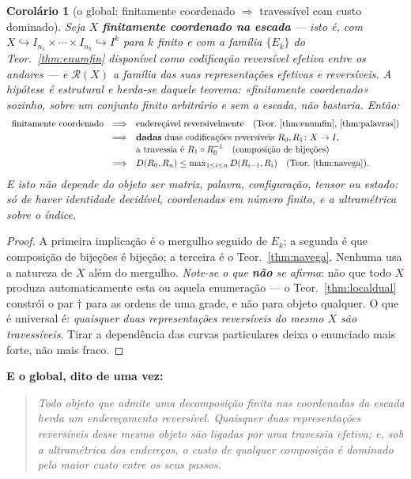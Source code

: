 \documentclass[11pt,a4paper]{article}
\newtheorem{corolario}[teorema]{Corolário}
\begin{document}
\begin{corolario}[o global: finitamente coordenado $\Rightarrow$ travessível com custo dominado]\label{cor:global}
Seja $X$ \textbf{finitamente coordenado \emph{na escada}} --- isto é, com
$X\hookrightarrow I_{n_1}\times\cdots\times I_{n_k}\hookrightarrow I^{k}$ para $k$
finito \emph{e} com a família $\{E_k\}$ do Teor.~\ref{thm:enumfin} disponível como
codificação reversível efetiva entre os andares --- e $\mathcal{R}(X)$ a família das
suas representações efetivas e reversíveis. \emph{A hipótese é estrutural e herda-se
daquele teorema}: «finitamente coordenado» sozinho, sobre um conjunto finito
arbitrário e sem a escada, não bastaria. Então:
\[
\begin{array}{rcl}
\text{finitamente coordenado} &\Longrightarrow& \text{endereçável reversivelmente}
   \quad(\text{Teor.~\ref{thm:enumfin}, \ref{thm:palavras}})\\[3pt]
&\Longrightarrow& \textbf{dadas} \text{ duas codificações reversíveis } R_0,R_1\colon X\to I,\\[1pt]
&& \text{a travessia é } R_1\circ R_0^{-1}\quad(\text{composição de bijeções})\\[3pt]
&\Longrightarrow& D(R_0,R_n)\le\max_{1\le i\le n} D(R_{i-1},R_i)
   \quad(\text{Teor.~\ref{thm:navega}}).
\end{array}
\]
E isto não depende do objeto ser matriz, palavra, configuração, tensor ou estado:
só de haver identidade decidível, coordenadas em número finito, e a ultramétrica
sobre o índice.
\end{corolario}

\begin{proof}
A primeira implicação é o mergulho seguido de $E_k$; a segunda é que composição de
bijeções é bijeção; a terceira é o Teor.~\ref{thm:navega}. Nenhuma usa a natureza de
$X$ além do mergulho. \emph{Note-se o que \textbf{não} se afirma}: não que todo $X$
produza automaticamente esta ou aquela enumeração --- o Teor.~\ref{thm:localdual}
constrói o par $\dagger$ para as ordens de uma grade, e não para objeto qualquer.
O que é universal é: \emph{quaisquer duas representações reversíveis do mesmo $X$
são travessíveis}. Tirar a dependência das curvas particulares deixa o enunciado
mais forte, não mais fraco.
\end{proof}

\medskip\noindent\textbf{E o global, dito de uma vez:}
\begin{quote}
\emph{Todo objeto que admite uma decomposição finita nas coordenadas da escada herda
um endereçamento reversível. Quaisquer duas representações reversíveis desse mesmo
objeto são ligadas por uma travessia efetiva; e, sob a ultramétrica dos endereços, o
custo de qualquer composição é dominado pelo maior custo entre os seus passos.}
\end{quote}
\end{document}
